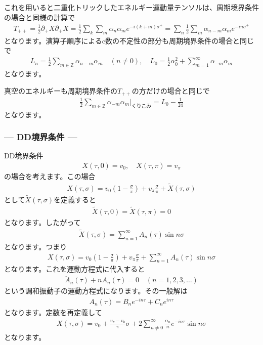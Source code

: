 \documentclass[report,paper=a4, fontsize=12pt, line_length=16cm, number_of_lines=33,dvipdfmx]{jlreq}
\numberwithin{equation}{chapter}
\numberwithin{equation}{section}
\newcommand{\Zb}{\mathbb{Z}}
\newcommand{\del}{\partial}
\begin{document}
これを用いると二重化トリックしたエネルギー運動量テンソルは、周期境界条件の場合と同様の計算で
\begin{align}
  T_{++}=\frac12 \del_{+}X\del_{+}X
  =\frac12 \sum_{k}\sum_{m}\alpha_{n}\alpha_{m}e^{-i(k+m)\sigma^{+}}
  =\sum_{n}\frac12\sum_{m}\alpha_{n-m}\alpha_{m}e^{-in\sigma^{+}}
\end{align}
となります。演算子順序によるc数の不定性の部分も周期境界条件の場合と同じで
\begin{align}
  L_{n}=\frac12\sum_{m\in\Zb}\alpha_{n-m}\alpha_{m} \quad (n\ne 0),\quad
  L_{0}=\frac12 \alpha_{0}^2+\sum_{m=1}^{\infty}\alpha_{-m}\alpha_{m}
\end{align}
となります。

真空のエネルギーも周期境界条件の$T_{++}$の方だけの場合と同じで
\begin{align}
  \frac12\sum_{m\in\Zb}\alpha_{-m}\alpha_{m}\Bigg|_{\text{くりこみ}}=L_{0}-\frac{1}{24}
\end{align}
となります。

\subsubsection*{--- DD境界条件 ---}
DD境界条件
\begin{align}
  X(\tau,0)=v_0,\quad X(\tau,\pi)=v_{\pi}
\end{align}
の場合を考えます。この場合
\begin{align}
  X(\tau,\sigma)=v_{0}\left( 1-\frac{\sigma}{\pi} \right)+v_{\pi}\frac{\sigma}{\pi}+\widetilde{X}(\tau,\sigma)
\end{align}
として$\widetilde{X}(\tau,\sigma)$を定義すると
\begin{align}
  \widetilde{X}(\tau,0)=\widetilde{X}(\tau,\pi)=0
\end{align}
となります。したがって
\begin{align}
  \widetilde{X}(\tau,\sigma)=\sum_{n=1}^{\infty}A_{n}(\tau)\sin n\sigma
\end{align}
となります。つまり
\begin{align}
  X(\tau,\sigma)=v_{0}\left( 1-\frac{\sigma}{\pi} \right)+v_{\pi}\frac{\sigma}{\pi}+\sum_{n=1}^{\infty}A_{n}(\tau)\sin n\sigma
\end{align}
となります。これを運動方程式に代入すると
\begin{align}
  \ddot{A}_{n}(\tau)+nA_{n}(\tau)=0 \quad (n=1,2,3,\dots)
\end{align}
という調和振動子の運動方程式になります。その一般解は
\begin{align}
  A_{n}(\tau)=B_{n}e^{-in\tau}+C_{n}e^{in\tau}
\end{align}
となります。定数を再定義して
\begin{align}
  X(\tau,\sigma)=v_{0}+\frac{v_{\pi}-v_{0}}{\pi}\sigma+2\sum_{n\ne 0}^{\infty}\frac{\alpha_{n}}{n}e^{-in\tau}\sin n\sigma
\end{align}
となります。
\end{document}
